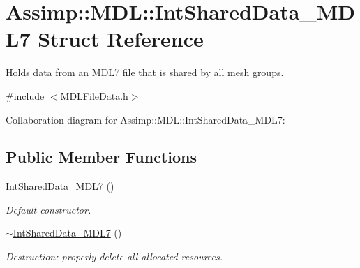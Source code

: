 \hypertarget{struct_assimp_1_1_m_d_l_1_1_int_shared_data___m_d_l7}{\section{Assimp\+:\+:M\+D\+L\+:\+:Int\+Shared\+Data\+\_\+\+M\+D\+L7 Struct Reference}
\label{struct_assimp_1_1_m_d_l_1_1_int_shared_data___m_d_l7}
}


Holds data from an M\+D\+L7 file that is shared by all mesh groups.  




{\ttfamily \#include $<$M\+D\+L\+File\+Data.\+h$>$}



Collaboration diagram for Assimp\+:\+:M\+D\+L\+:\+:Int\+Shared\+Data\+\_\+\+M\+D\+L7\+:
\subsection*{Public Member Functions}
\begin{DoxyCompactItemize}
\item 
\hypertarget{struct_assimp_1_1_m_d_l_1_1_int_shared_data___m_d_l7_aedc128b9a9f06bcb75e9d4a89572fdd9}{\hyperlink{struct_assimp_1_1_m_d_l_1_1_int_shared_data___m_d_l7_aedc128b9a9f06bcb75e9d4a89572fdd9}{Int\+Shared\+Data\+\_\+\+M\+D\+L7} ()}\label{struct_assimp_1_1_m_d_l_1_1_int_shared_data___m_d_l7_aedc128b9a9f06bcb75e9d4a89572fdd9}

\begin{DoxyCompactList}\small\item\em Default constructor. \end{DoxyCompactList}\item 
\hypertarget{struct_assimp_1_1_m_d_l_1_1_int_shared_data___m_d_l7_a1750d5fc0886a96eabde6b2b9b710f48}{\hyperlink{struct_assimp_1_1_m_d_l_1_1_int_shared_data___m_d_l7_a1750d5fc0886a96eabde6b2b9b710f48}{$\sim$\+Int\+Shared\+Data\+\_\+\+M\+D\+L7} ()}\label{struct_assimp_1_1_m_d_l_1_1_int_shared_data___m_d_l7_a1750d5fc0886a96eabde6b2b9b710f48}

\begin{DoxyCompactList}\small\item\em Destruction\+: properly delete all allocated resources. \end{DoxyCompactList}\end{DoxyCompactItemize}
